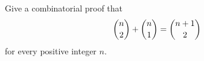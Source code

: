 Give a combinatorial proof that
\[\dbinom{n}{2}+\dbinom{n}{1}=\dbinom{n+1}{2}\]
for every positive integer $n$.
